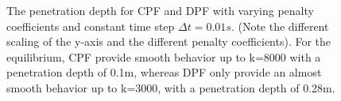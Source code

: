 \begin{figure}[h!] 
\begin{minipage}[b]{0.5 \linewidth}
		\centering
	\end{minipage}
	\begin{minipage}[b]{0.5 \linewidth}
		\centering
	\end{minipage}
  \caption[The penetration depth for CPF and DPF with varying penalty coefficients and constant time step $\Delta t=0.01s$.]{The penetration depth for CPF and DPF with varying penalty coefficients and constant time step $\Delta t=0.01s$. (Note the different scaling of the y-axis and the different penalty coefficients). For the equilibrium, CPF provide smooth behavior up to k=8000 with a penetration depth of 0.1m, whereas DPF only provide an almost smooth behavior up to k=3000, with a penetration depth of 0.28m.}
  \label{fig::pendepth_comp}
\end{figure}

